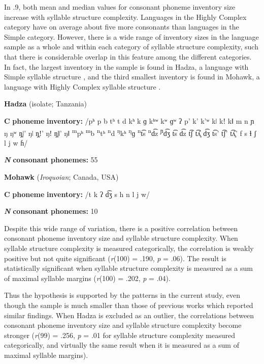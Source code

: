   In .9, both mean and median values for consonant phoneme inventory size increase with syllable structure complexity. Languages in the Highly Complex category have on average about five more consonants than languages in the Simple category. However, there is a wide range of inventory sizes in the language sample as a whole and within each category of syllable structure complexity, such that there is considerable overlap in this feature among the different categories. In fact, the largest inventory in the sample is found in Hadza, a language with Simple syllable structure , and the third smallest inventory is found in Mohawk, a language with Highly Complex syllable structure .

\ea\label{ex:(4.20)}
   \textbf{Hadza} (isolate; Tanzania)

\textbf{C} \textbf{phoneme} \textbf{inventory:} /pʰ p b tʰ t d kʰ k ɡ kʰʷ kʷ ɡʷ ʔ p’ k’ k’ʷ kǀ kǃ kǁ m n ɲ ŋ ŋʷ ŋ̥ǀ’ ŋǀ ŋ̥ǃ’ ŋǃ ŋ̥ǁ’ ŋǁ \textsuperscript{m}pʰ \textsuperscript{m}b \textsuperscript{n}tʰ \textsuperscript{n}d \textsuperscript{ŋ}kʰ \textsuperscript{ŋ}ɡ \textsuperscript{n}t͡s \textsuperscript{n}d͡z \textsuperscript{ɲ}d͡ʒ t͡s d͡z t͡ʃ t͡ʎ̥ d͡ʒ t͡s’ t͡ʃ’ t͡ʎ̥’ f s ɬ ʃ l j w ɦ/

\textbf{\textit{N}} \textbf{consonant} \textbf{phonemes:} 55

\z

\ea\label{ex:(4.21)}
  \textbf{Mohawk} (\textit{Iroquoian}; Canada, USA)

\textbf{C} \textbf{phoneme} \textbf{inventory:} /t k ʔ d͡ʒ s h n l j w/

\textbf{\textit{N}} \textbf{consonant} \textbf{phonemes:} 10
\z

  Despite this wide range of variation, there is a positive correlation between consonant phoneme inventory size and syllable structure complexity. When syllable structure complexity is measured categorically, the correlation is weakly positive but not quite significant (\textit{r}(100) = .190, \textit{p} = .06). The result is statistically significant when syllable structure complexity is measured as a sum of maximal syllable margins (\textit{r}(100) = .202, \textit{p} = .04).

  Thus the hypothesis is supported by the patterns in the current study, even though the sample is much smaller than those of previous works which reported similar findings. When Hadza is excluded as an outlier, the correlations between consonant phoneme inventory size and syllable structure complexity become stronger (\textit{r}(99) = .256, \textit{p} = .01 for syllable structure complexity measured categorically, and virtually the same result when it is measured as a sum of maximal syllable margins).

